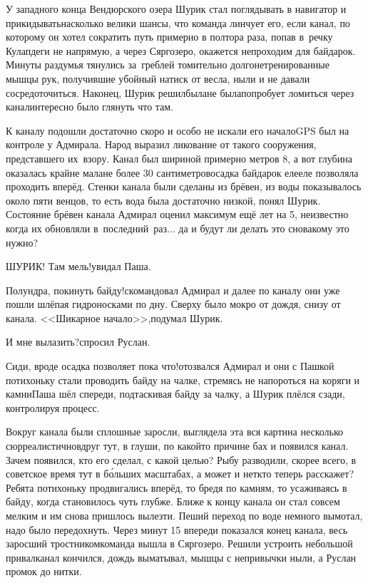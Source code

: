 У западного конца Вендюрского озера Шурик стал поглядывать в навигатор и прикидывать\mdash насколько велики шансы, что команда линчует его, если канал, по которому он хотел сократить путь примерно в полтора раза, попав в~речку Кулапдеги не напрямую, а через Сяргозеро, окажется непроходим для байдарок. Минуты раздумья тянулись за~греблей томительно долго\mdash нетренированные мышцы рук, получившие убойный натиск от весла, ныли и не давали сосредоточиться. Наконец, Шурик решил\mdash была\sdash не была\mdash попробует ломиться через канал\mdash интересно было глянуть что там.

К каналу подошли достаточно скоро и особо не искали его начало\mdash GPS был на контроле у Адмирала. Народ выразил ликование от такого сооружения, представшего их~взору. Канал был шириной примерно метров 8, а вот глубина оказалась крайне мала\mdash не более 30 сантиметров\mdash осадка байдарок еле\sdash еле позволяла проходить вперёд. Стенки канала были сделаны из брёвен, из воды показывалось около пяти венцов, то есть вода была достаточно низкой, понял Шурик. Состояние брёвен канала Адмирал оценил максимум ещё лет на 5, неизвестно когда их обновляли в~последний~раз$\ldots$ да и будут ли делать это снова\mdash кому это нужно?

\diagdash ШУРИК! Там мель!\mdash увидал Паша. 

\diagdash Полундра, покинуть байду!\mdash скомандовал Адмирал и далее по каналу они уже пошли шлёпая гидроносками по дну. Сверху было мокро от дождя, снизу от канала. <<Шикарное начало>>,\mdash подумал Шурик.

\diagdash И мне вылазить?\mdash спросил Руслан. 

\diagdash Сиди, вроде осадка позволяет пока что!\mdash отозвался Адмирал и они с Пашкой потихоньку стали проводить байду на чалке, стремясь не напороться на коряги и камни\mdash Паша шёл спереди, подтаскивая байду за чалку, а Шурик плёлся сзади, контролируя процесс.

Вокруг канала были сплошные заросли, выглядела эта вся картина несколько сюрреалистично\mdash вдруг тут, в глуши, по какой\sdash то причине бах и появился канал. Зачем появился, кто его сделал, с какой целью? Рыбу разводили, скорее всего, в советское время тут в б\'{о}льших масштабах, а может и нет\mdash кто теперь расскажет? Ребята потихоньку продвигались вперёд, то бредя по камням, то усаживаясь в байду, когда становилось чуть глубже. Ближе к концу канала он стал совсем мелким и им снова пришлось вылезти. Пеший переход по воде немного вымотал, надо было передохнуть. Через минут 15 впереди показался конец канала, весь заросший тростником\mdash команда вышла в Сяргозеро. Решили устроить небольшой привал\mdash канал кончился, дождь выматывал, мышцы с непривычки ныли, а Руслан промок до нитки.

